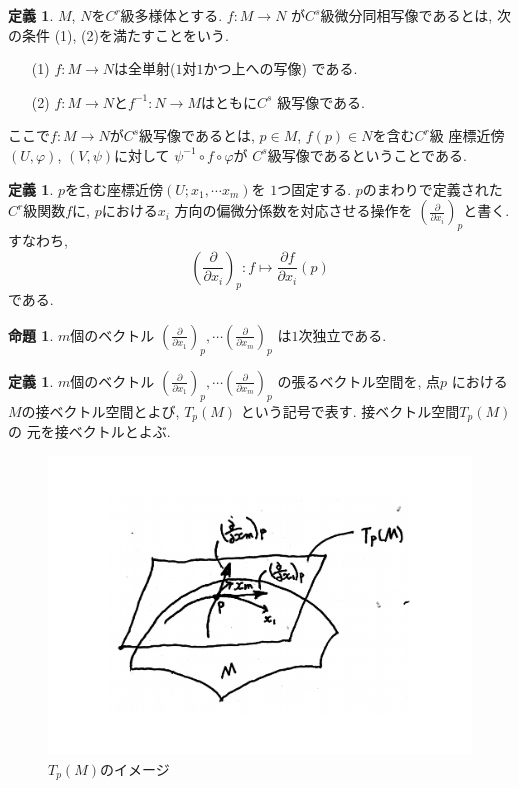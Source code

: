 \documentclass[twocolumn]{jarticle}
\theoremstyle{definition}
\newtheorem{definition}[theorem]{定義}
\newtheorem{proposition}[theorem]{命題}
\begin{document}
\begin{definition}\label{def:C^s deffeomorphism}
  $M$, $N$を$C^r$級多様体とする. $f:M\to N$
  が$C^s$級微分同相写像であるとは, 次の条件
  (1), (2)を満たすことをいう. 
  \begin{itemize}
      \item[(1)]
      $f:M\to N$は全単射($1$対$1$かつ上への写像)
      である. 
      \item[(2)] 
      $f:M\to N$と$f^{-1}:N\to M$はともに$C^s$
      級写像である. 
  \end{itemize}
  ここで$f:M\to N$が$C^s$級写像であるとは, 
  $p\in M$, $f(p)\in N$を含む$C^r$級
座標近傍$(U,\varphi)$, $(V,\psi)$に対して
  $\psi^{-1} \circ f\circ \varphi$が
  $C^s$級写像であるということである. 
\end{definition}
\begin{definition}
  $p$を含む座標近傍$(U;x_1,\cdots x_m)$を
  $1$つ固定する. $p$のまわりで定義された
  $C^r$級関数$f$に, $p$における$x_i$
  方向の偏微分係数を対応させる操作を
  $\left(\frac{\partial}{\partial x_i}
  \right)_p$と書く. すなわち, 
  $$\left(\frac{\partial}{\partial x_i}
  \right)_p:f\mapsto 
  \frac{\partial f}{\partial x_i}(p)$$
  である. 
\end{definition}
\begin{proposition} 
  $m$個のベクトル
  $\left(\frac{\partial}{\partial x_1}\right)_p, 
  \cdots 
  \left(\frac{\partial}{\partial x_m}\right)_p$
  は$1$次独立である. 
\end{proposition}
\begin{definition}\label{def:tangent vector space}
  $m$個のベクトル
  $\left(\frac{\partial}{\partial x_1}\right)_p, 
  \cdots 
  \left(\frac{\partial}{\partial x_m}\right)_p$
  の張るベクトル空間を, 点$p$
  における$M$の接ベクトル空間とよび, 
  $T_p(M)$
  という記号で表す. 接ベクトル空間$T_p(M)$の
  元を接ベクトルとよぶ. 
\end{definition}
\begin{figure}[H]
      \centering
      \includegraphics[keepaspectratio, scale=0.3]{tangentVectorSpace_2.pdf}
      \caption{$T_p(M)$のイメージ}
      \label{}
\end{figure}
\end{document}
